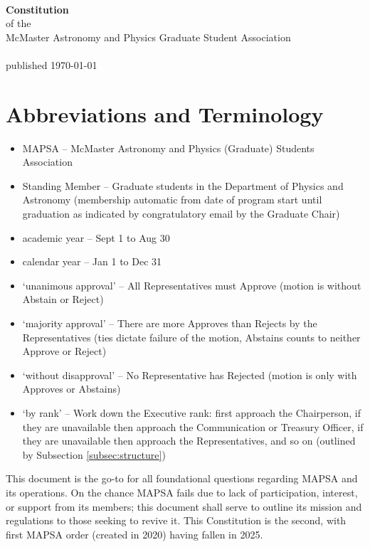 \documentclass[8pt]{article}
\begin{document}
	~
	\vspace{4in}
	\begin{center}
		\textbf{\Huge{Constitution}}\\\normalsize{of the}\\McMaster Astronomy and Physics Graduate Student Association\\~\\
		published \today
	\end{center}
	\vfill
	
	\pagebreak
	\tableofcontents	
	\section*{Abbreviations and Terminology}
	\begin{itemize}
	\item MAPSA -- McMaster Astronomy and Physics (Graduate) Students Association
	\item Standing Member -- Graduate students in the Department of Physics and Astronomy (membership automatic from date of program start until graduation as indicated by congratulatory email by the Graduate Chair) 
	\item academic year -- Sept 1 to Aug 30
	\item calendar year -- Jan 1 to Dec 31
	\item `unanimous approval' -- All Representatives must Approve (motion is without Abstain or Reject)
	\item `majority approval' -- There are more Approves than Rejects by the Representatives (ties dictate failure of the motion, Abstains counts to neither Approve or Reject)
	\item `without disapproval' -- No Representative has Rejected (motion is only with Approves or Abstains)
	\item `by rank' -- Work down the Executive rank: first approach the Chairperson, if they are unavailable then approach the Communication or Treasury Officer, if they are unavailable then approach the Representatives, and so on (outlined by Subsection \ref{subsec:structure})
	\pagebreak
	\end{itemize}
	This document is the go-to for all foundational questions regarding MAPSA and its operations. On the chance MAPSA fails due to lack of participation, interest, or support from its members; this document shall serve to outline its mission and regulations to those seeking to revive it. This Constitution is the second, with first MAPSA order (created in 2020) having fallen in 2025.
\end{document}
